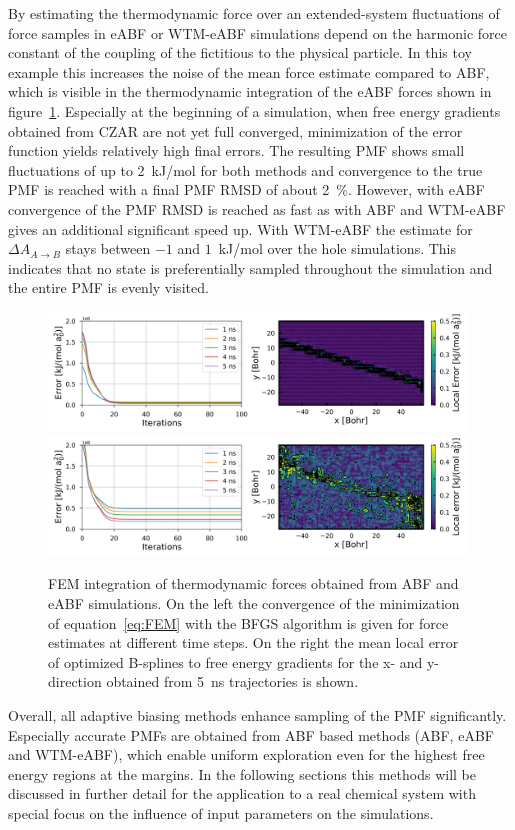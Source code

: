 By estimating the thermodynamic force over an extended-system fluctuations of force samples in eABF or WTM-eABF simulations depend on the harmonic force constant of the coupling of the fictitious to the physical particle.
In this toy example this increases the noise of the mean force estimate compared to ABF, which is visible in the thermodynamic integration of the eABF forces shown in figure~\ref{fig:ti}.
Especially at the beginning of a simulation, when free energy gradients obtained from CZAR are not yet full converged, minimization of the error function yields relatively high final errors.
The resulting PMF shows small fluctuations of up to 2~kJ/mol for both methods and convergence to the true PMF is reached with a final PMF RMSD of about 2~\%.
However, with eABF convergence of the PMF RMSD is reached as fast as with ABF and WTM-eABF gives an additional significant speed up.
With WTM-eABF the estimate for $\Delta A_{A\to B}$ stays between $-1$ and $1$~kJ/mol over the hole simulations.
This indicates that no state is preferentially sampled throughout the simulation and the entire PMF is evenly visited.
\begin{figure}[H]
  \centering
  \includegraphics[width=0.99\textwidth]{bilder/test_2D/ti}
  \includegraphics[width=0.99\textwidth]{bilder/test_2D/ti_eABF}
  \caption{
  FEM integration of thermodynamic forces obtained from ABF and eABF simulations.
  On the left the convergence of the minimization of equation~\ref{eq:FEM} with the BFGS algorithm is given for force estimates at different time steps. On the right the mean local error of optimized B-splines to free energy gradients for the x- and y-direction obtained from 5~ns trajectories is shown.}
\label{fig:ti}%
\end{figure}
Overall, all adaptive biasing methods enhance sampling of the PMF significantly.
Especially accurate PMFs are obtained from ABF based methods (ABF, eABF and WTM-eABF), which enable uniform exploration even for the highest free energy regions at the margins.
In the following sections this methods will be discussed in further detail for the application to a real chemical system with special focus on the influence of input parameters on the simulations.
\newpage
